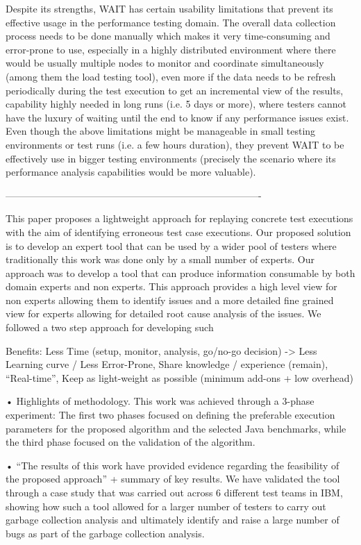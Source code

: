 \documentclass[runningheads,a4paper]{llncs}
\begin{document}
Despite its strengths, WAIT has certain usability limitations that prevent its
effective usage in the performance testing domain. The overall data collection
process needs to be done manually which makes it very time-consuming and
error-prone to use, especially in a highly distributed environment where there
would be usually multiple nodes to monitor and coordinate simultaneously
(among them the load testing tool), even more if the data needs to be refresh
periodically during the test execution to get an incremental view of the
results, capability highly needed in long runs (i.e. 5 days or more), where
testers cannot have the luxury of waiting until the end to know if any
performance issues exist. Even though the above limitations might be manageable
in small testing environments or test runs (i.e. a few hours duration), they
prevent WAIT to be effectively use in bigger testing environments (precisely the 
scenario where its performance analysis capabilities would be more valuable).

-------------------------------------------------------------------------------

This paper proposes a lightweight approach for replaying
concrete test executions with the aim of identifying erroneous test case executions.
Our proposed solution is to develop an expert tool that can be used by a wider
pool of testers where traditionally this work was done only by a small number of experts. Our approach was to develop a tool that can 
produce information consumable by both domain experts and non experts. This approach provides a high level view for non experts allowing them to 
identify issues and a more detailed fine grained view for experts allowing for
detailed root cause analysis of the issues. We followed a two step approach for developing such

Benefits: Less Time (setup, monitor, analysis, go/no-go decision) -> Less
Learning curve / Less Error-Prone, Share knowledge / experience (remain), “Real-time”, Keep as light-weight as possible (minimum add-ons + low overhead)

•	Highlights of methodology.
This work was achieved through a 3-phase experiment: The first two phases
focused on defining the preferable execution parameters for the proposed algorithm and the 
selected Java benchmarks, while the third phase focused on the validation of the algorithm. 

•	“The results of this work have provided evidence regarding the feasibility of the proposed approach” + summary of key results.
We have validated the tool through a case study that was carried out across 6
different test teams in IBM, showing how such a tool allowed for a larger number of testers to carry out garbage collection analysis and ultimately identify and raise a large number of bugs as part of the garbage collection analysis.
\end{document}
